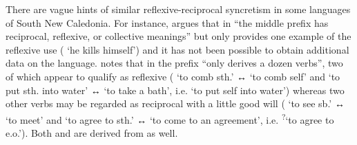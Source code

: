 There are vague hints of similar reflexive-reciprocal syncretism in some languages of South New Caledonia. For instance, \citet[39]{bril:2005} argues that in  “the middle prefix  has reciprocal, reflexive, or collective meanings” but only provides one example of the reflexive use ( ‘he kills himself’) and it has not been possible to obtain additional data on the language. \citet[1047]{moyse-faurie:2015} notes that in  the prefix  “only derives a dozen verbs”, two of which appear to qualify as reflexive ( ‘to comb sth.’ ↔  ‘to comb self’ and  ‘to put sth. into water’ ↔  ‘to take a bath’, i.e. ‘to put self into water’) whereas two other verbs may be regarded as reciprocal with a little good will ( ‘to see sb.’ ↔  ‘to meet’ and  ‘to agree to sth.’ ↔  ‘to come to an agreement’, i.e. \textsuperscript{?}‘to agree to e.o.’). Both   and   are derived from   as well.

